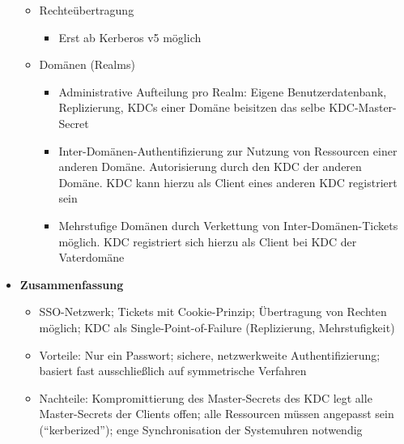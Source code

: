 \begin{itemize}
\begin{itemize}
\begin{itemize}
\begin{itemize}
			\end{itemize}
		\end{itemize}
		\item Rechteübertragung %
		\begin{itemize}
			\item Erst ab Kerberos v5 möglich
		\end{itemize}
		\item Domänen (Realms)
		\begin{itemize}
			\item Administrative Aufteilung pro Realm: Eigene Benutzerdatenbank, Replizierung, KDCs einer Domäne beisitzen das selbe KDC-Master-Secret
			\item Inter-Domänen-Authentifizierung zur Nutzung von Ressourcen einer anderen Domäne. Autorisierung durch den KDC der anderen Domäne. KDC kann hierzu als Client eines anderen KDC registriert sein
			\item Mehrstufige Domänen durch Verkettung von Inter-Domänen-Tickets möglich. KDC registriert sich hierzu als Client bei KDC der Vaterdomäne
		\end{itemize}
	\end{itemize}
	\item \textbf{Zusammenfassung}
	\begin{itemize}
		\item SSO-Netzwerk; Tickets mit Cookie-Prinzip; Übertragung von Rechten möglich; KDC als Single-Point-of-Failure (Replizierung, Mehrstufigkeit)
		\item Vorteile: Nur ein Passwort; sichere, netzwerkweite Authentifizierung; basiert fast ausschließlich auf symmetrische Verfahren
		\item Nachteile: Kompromittierung des Master-Secrets des KDC legt alle Master-Secrets der Clients offen; alle Ressourcen müssen angepasst sein ("`kerberized"'); enge Synchronisation der Systemuhren notwendig
	\end{itemize}
\end{itemize}




